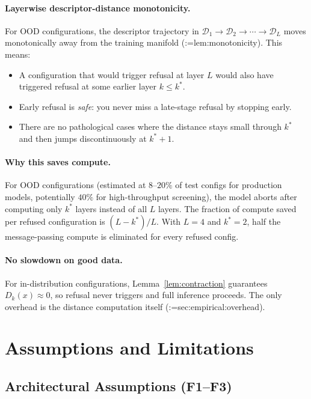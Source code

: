 \documentclass[11pt,a4paper]{article}
\makeatletter
\newcommand{\cref}[1]{\begingroup\def\crefsep{}\@for\crefitem:=#1\do{\crefsep\ref{\crefitem}\def\crefsep{, }}\endgroup}
\makeatother
\begin{document}
\paragraph{Layerwise descriptor-distance monotonicity.} For OOD configurations, the descriptor trajectory in $\mathcal{D}_1\to\mathcal{D}_2\to\cdots\to\mathcal{D}_L$ moves monotonically away from the training manifold (\cref{lem:monotonicity}). This means:
\begin{itemize}
    \item A configuration that would trigger refusal at layer $L$ would also have triggered refusal at some earlier layer $k\le k^*$.
    \item Early refusal is \emph{safe}: you never miss a late-stage refusal by stopping early.
    \item There are no pathological cases where the distance stays small through $k^*$ and then jumps discontinuously at $k^*+1$.
\end{itemize}

\paragraph{Why this saves compute.} For OOD configurations (estimated at $8$--$20\%$ of test configs for production models, potentially $40\%$ for high-throughput screening), the model aborts after computing only $k^*$ layers instead of all $L$ layers. The fraction of compute saved per refused configuration is $(L-k^*)/L$. With $L=4$ and $k^*=2$, half the message-passing compute is eliminated for every refused config.

\paragraph{No slowdown on good data.} For in-distribution configurations, Lemma~\ref{lem:contraction} guarantees $D_k(x)\approx 0$, so refusal never triggers and full inference proceeds. The only overhead is the distance computation itself (\cref{sec:empirical:overhead}).

\section{Assumptions and Limitations}\label{sec:limitations}

\subsection{Architectural Assumptions (F1--F3)}
\end{document}

